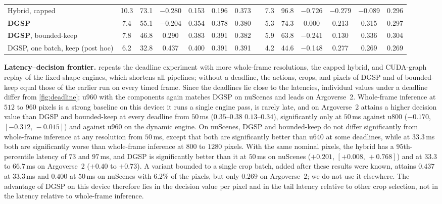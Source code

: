 \documentclass[10pt,letterpaper]{article}
\newcommand{\method}{DGSP\xspace}
\newcommand{\ci}[2]{[#1,\allowbreak\,#2]}
\newcommand{\oursrow}{\rowcolor{oursbg}}
\theoremstyle{remark}
\theoremstyle{plain}
\theoremstyle{definition}
\begin{document}
\begin{table}[!htbp]
\begin{tabular}{@{}lccccccccccccc@{}}
\midrule
Hybrid, capped & 10.3 & 73.1 & $-$0.280 & 0.153 & 0.196 & 0.373 & & 7.3 & 96.8 & $-$0.726 & $-$0.279 & $-$0.089 & 0.296 \\
\oursrow \textbf{\method} & 7.4 & 55.1 & $-$0.204 & 0.354 & 0.378 & 0.380 & & 5.3 & 74.3 & 0.000 & 0.213 & 0.315 & 0.297 \\
\oursrow \textbf{\method}, bounded-keep & 7.8 & 46.8 & 0.290 & 0.383 & 0.391 & 0.382 & & 5.9 & 63.8 & $-$0.241 & 0.130 & 0.336 & 0.304 \\
\method, one batch, keep (post hoc) & 6.2 & 32.8 & 0.437 & 0.400 & 0.391 & 0.391 & & 4.2 & 44.6 & $-$0.148 & 0.277 & 0.269 & 0.269 \\
\bottomrule
\end{tabular}
\end{table}

\noindent\textbf{Latency--decision frontier.}
 repeats the deadline experiment with more whole-frame resolutions, the capped hybrid, and CUDA-graph replay of the fixed-shape engines, which shortens all pipelines; without a deadline, the actions, crops, and pixels of \method and of bounded-keep equal those of the earlier run on every timed frame.
Since the deadlines lie close to the latencies, individual values under a deadline differ from \cref{fig:deadline}; u960 with the components again matches \method on nuScenes and leads on Argoverse~2.
Whole-frame inference at $512$ to $960$ pixels is a strong baseline on this device: it runs a single engine pass, is rarely late, and on Argoverse~2 attains a higher decision value than \method and bounded-keep at every deadline from $50$\,ms ($0.35$--$0.38$ \vs $0.13$--$0.34$), significantly only at $50$\,ms against u800 ($-0.170$, $\ci{-0.312}{-0.015}$) and against u960 on the dynamic engine.
On nuScenes, \method and bounded-keep do not differ significantly from whole-frame inference at any resolution from $50$\,ms, except that both are significantly better than u640 at some deadlines, while at $33.3$\,ms both are significantly worse than whole-frame inference at $800$ to $1280$ pixels.
With the same nominal pixels, the hybrid has a $95$th-percentile latency of $73$ and $97$\,ms, and \method is significantly better than it at $50$\,ms on nuScenes ($+0.201$, $\ci{+0.008}{+0.768}$) and at $33.3$ to $66.7$\,ms on Argoverse~2 ($+0.40$ to $+0.73$).
A variant bounded to a single crop batch, added after these results were known, attains $0.437$ at $33.3$\,ms and $0.400$ at $50$\,ms on nuScenes with $6.2\%$ of the pixels, but only $0.269$ on Argoverse~2; we do not use it elsewhere.
The advantage of \method on this device therefore lies in the decision value per pixel and in the tail latency relative to other crop selection, not in the latency relative to whole-frame inference.
\end{document}
